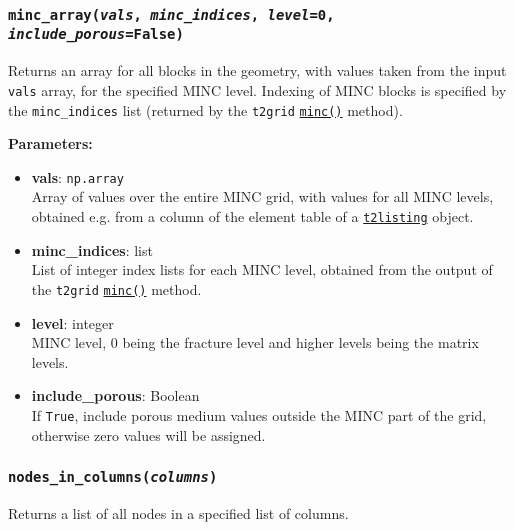 \begin{snugshade}\subsubsection{\texttt{minc\_array(\emph{vals}, \emph{minc\_indices}, \emph{level}=0, \emph{include\_porous}=False)}}\end{snugshade}
\label{sec:mulgrid:minc_array}

Returns an array for all blocks in the geometry, with values taken from the input \texttt{vals} array, for the specified MINC level. Indexing of MINC blocks is specified by the \texttt{minc\_indices} list (returned by the \texttt{t2grid} \hyperref[sec:t2grid:MINC]{\texttt{minc()}} method).

\textbf{Parameters:}
\begin{itemize}
\item \textbf{vals}: \texttt{np.array}\\
  Array of values over the entire MINC grid, with values for all MINC levels, obtained e.g. from a column of the element table of a \hyperref[sec:t2listing]{\texttt{t2listing}} object.
\item \textbf{minc\_indices}: list\\
  List of integer index lists for each MINC level, obtained from the output of the \texttt{t2grid} \hyperref[sec:t2grid:MINC]{\texttt{minc()}} method.
\item \textbf{level}: integer\\
  MINC level, 0 being the fracture level and higher levels being the matrix levels.
\item \textbf{include\_porous}: Boolean\\
  If \texttt{True}, include porous medium values outside the MINC part of the grid, otherwise zero values will be assigned.
\end{itemize}

\begin{snugshade}\subsubsection{\texttt{nodes\_in\_columns(\emph{columns})}}\end{snugshade}
\label{sec:mulgrid:nodes_in_columns}

Returns a list of all nodes in a specified list of columns.

